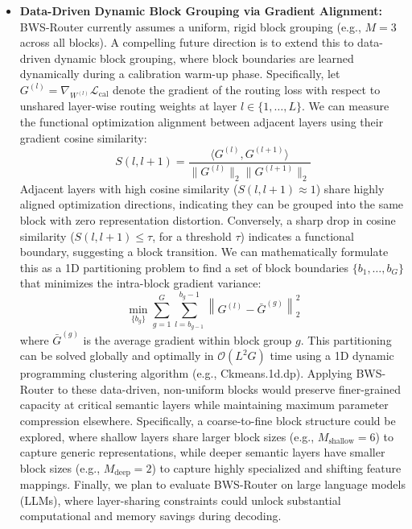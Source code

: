 \begin{itemize}
    \item \textbf{Data-Driven Dynamic Block Grouping via Gradient Alignment:} BWS-Router currently assumes a uniform, rigid block grouping (e.g., $M=3$ across all blocks). A compelling future direction is to extend this to data-driven dynamic block grouping, where block boundaries are learned dynamically during a calibration warm-up phase. Specifically, let $G^{(l)} = \nabla_{W^{(l)}} \mathcal{L}_{\text{cal}}$ denote the gradient of the routing loss with respect to unshared layer-wise routing weights at layer $l \in \{1, \dots, L\}$. We can measure the functional optimization alignment between adjacent layers using their gradient cosine similarity:
    \begin{equation}
        S(l, l+1) = \frac{\langle G^{(l)}, G^{(l+1)} \rangle}{\|G^{(l)}\|_2 \|G^{(l+1)}\|_2}
    \end{equation}
    Adjacent layers with high cosine similarity ($S(l, l+1) \approx 1$) share highly aligned optimization directions, indicating they can be grouped into the same block with zero representation distortion. Conversely, a sharp drop in cosine similarity ($S(l, l+1) \le \tau$, for a threshold $\tau$) indicates a functional boundary, suggesting a block transition. We can mathematically formulate this as a 1D partitioning problem to find a set of block boundaries $\{b_1, \dots, b_{G}\}$ that minimizes the intra-block gradient variance:
    \begin{equation}
        \min_{\{b_g\}} \sum_{g=1}^G \sum_{l=b_{g-1}}^{b_g - 1} \left\| G^{(l)} - \bar{G}^{(g)} \right\|_2^2
    \end{equation}
    where $\bar{G}^{(g)}$ is the average gradient within block group $g$. This partitioning can be solved globally and optimally in $\mathcal{O}(L^2 G)$ time using a 1D dynamic programming clustering algorithm (e.g., Ckmeans.1d.dp). Applying BWS-Router to these data-driven, non-uniform blocks would preserve finer-grained capacity at critical semantic layers while maintaining maximum parameter compression elsewhere. Specifically, a coarse-to-fine block structure could be explored, where shallow layers share larger block sizes (e.g., $M_{\text{shallow}} = 6$) to capture generic representations, while deeper semantic layers have smaller block sizes (e.g., $M_{\text{deep}} = 2$) to capture highly specialized and shifting feature mappings. Finally, we plan to evaluate BWS-Router on large language models (LLMs), where layer-sharing constraints could unlock substantial computational and memory savings during decoding.

\end{itemize}
